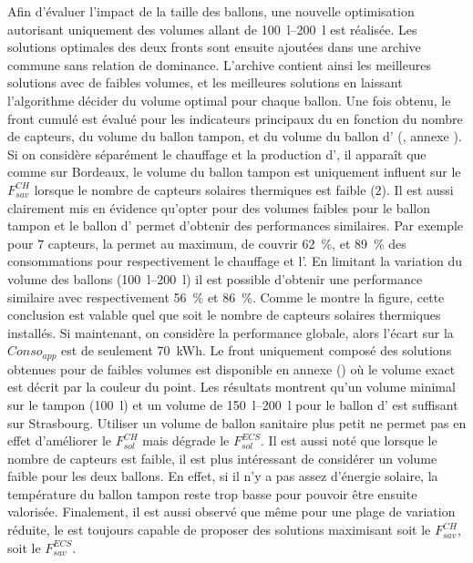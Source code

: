 Afin d’évaluer l’impact de la taille des ballons, une nouvelle optimisation
autorisant uniquement des volumes allant de \SIrange{100}{200}{\litre} est réalisée.
Les solutions optimales des deux fronts sont ensuite
ajoutées dans une archive commune sans relation de dominance. L’archive contient ainsi les meilleures
solutions avec de faibles volumes, et les meilleures solutions en laissant l’algorithme décider
du volume optimal pour chaque ballon.
Une fois obtenu, le front cumulé est évalué pour les indicateurs principaux du 
en fonction du nombre de capteurs, du volume du ballon tampon, et du volume du ballon d’
(, annexe ).
Si on considère séparément le chauffage et la production d’,
il apparaît que comme sur Bordeaux, le volume du ballon tampon est uniquement influent
sur le $F_{sav}^{CH}$ lorsque le nombre de capteurs solaires thermiques est faible ($2$).
Il est aussi clairement mis en évidence qu’opter pour des volumes faibles pour le
ballon tampon et le ballon d’ permet d’obtenir des performances similaires.
Par exemple pour $7$ capteurs, la  permet au maximum, de couvrir
\SI{62}{\percent}, et \SI{89}{\percent} des consommations pour respectivement le chauffage et l’.
En limitant la variation du volume des ballons (\SIrange{100}{200}{\litre}) il est possible d’obtenir
une performance similaire avec respectivement
\SI{56}{\percent} et \SI{86}{\percent}. Comme le montre la figure, cette conclusion est valable
quel que soit le nombre de capteurs solaires thermiques installés. Si maintenant, on considère
la performance globale, alors l’écart sur la $Conso_{app}$ est de seulement \SI{70}{kWh}.
Le front uniquement composé des solutions obtenues pour de faibles volumes est disponible
en annexe () où le volume exact est décrit par
la couleur du point. Les résultats montrent qu’un volume minimal sur le tampon (\SI{100}{\litre})
et un volume de \SIrange{150}{200}{\litre} pour le ballon d’ est suffisant sur Strasbourg.
Utiliser un volume de ballon sanitaire plus petit ne permet pas en effet d’améliorer le
$F_{sol}^{CH}$ mais dégrade le $F_{sol}^{ECS}$.
Il est aussi noté que lorsque le nombre de capteurs est faible, il est plus intéressant de
considérer un volume faible pour les deux ballons. En effet, si il n’y a pas assez
d’énergie solaire, la température du ballon tampon reste trop basse pour pouvoir être
ensuite valorisée. Finalement, il est aussi observé que même pour une plage de variation
réduite, le  est toujours capable de proposer des solutions maximisant soit le
$F_{sav}^{CH}$, soit le $F_{sav}^{ECS}$.

